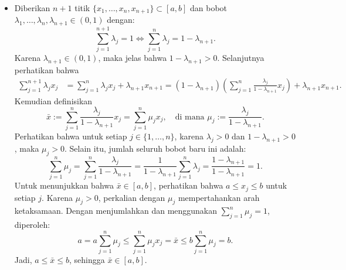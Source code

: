 \documentclass[aspectratio=169,11pt]{beamer}
\theoremstyle{definition}
\begin{document}
\begin{frame}[allowframebreaks]{\insertsection}{\insertsubsection}
\begin{itemize}
    \item Diberikan $n + 1$ titik $\{x_1, \dots, x_n, x_{n+1}\} \subset [a,b]$ dan bobot $\lambda_1, \dots, \lambda_n, \lambda_{n+1} \in (0,1)$ dengan:
          \begin{equation*}
            \sum_{j=1}^{n+1} \lambda_j = 1 \iff \sum_{j=1}^n \lambda_j = 1 - \lambda_{n+1}.
          \end{equation*}
          Karena $\lambda_{n+1} \in (0,1)$, maka jelas bahwa $1 - \lambda_{n+1} > 0$. Selanjutnya perhatikan bahwa
          \begin{align*}
            \sum_{j=1}^{n+1} \lambda_j x_j & = \sum_{j=1}^n \lambda_j x_j + \lambda_{n+1} x_{n+1} = (1 - \lambda_{n+1}) \left( \sum_{j=1}^n \frac{\lambda_j}{1 - \lambda_{n+1}} x_j \right) + \lambda_{n+1} x_{n+1}.
          \end{align*}
          Kemudian definisikan
          \begin{equation*}
            \bar{x} := \sum_{j=1}^n \frac{\lambda_j}{1 - \lambda_{n+1}} x_j = \sum_{j=1}^n \mu_j x_j, \quad \text{di mana } \mu_j := \frac{\lambda_j}{1 - \lambda_{n+1}}.
          \end{equation*}
          Perhatikan bahwa untuk setiap $j \in \{1, \dots, n\}$, karena $\lambda_j > 0$ dan $1 - \lambda_{n+1} > 0$, maka $\mu_j > 0$. Selain itu, jumlah seluruh bobot baru ini adalah:
          \begin{equation*}
            \sum_{j=1}^n \mu_j = \sum_{j=1}^n \frac{\lambda_j}{1 - \lambda_{n+1}} = \frac{1}{1 - \lambda_{n+1}} \sum_{j=1}^n \lambda_j = \frac{1 - \lambda_{n+1}}{1 - \lambda_{n+1}} = 1.
          \end{equation*}
          Untuk menunjukkan bahwa $\bar{x}\in[a,b]$, perhatikan bahwa $a\leq x_j\leq b$ untuk setiap $j$. Karena $\mu_j>0$, perkalian dengan $\mu_j$ mempertahankan arah ketaksamaan. Dengan menjumlahkan dan menggunakan $\sum_{j=1}^n\mu_j=1$, diperoleh:
          \begin{equation*}
            a=a\sum_{j=1}^n\mu_j
            \leq\sum_{j=1}^n\mu_jx_j=\bar{x}
            \leq b\sum_{j=1}^n\mu_j=b.
          \end{equation*}
          Jadi, $a\leq\bar{x}\leq b$, sehingga $\bar{x}\in[a,b]$.


\end{itemize}
\end{frame}
\end{document}
